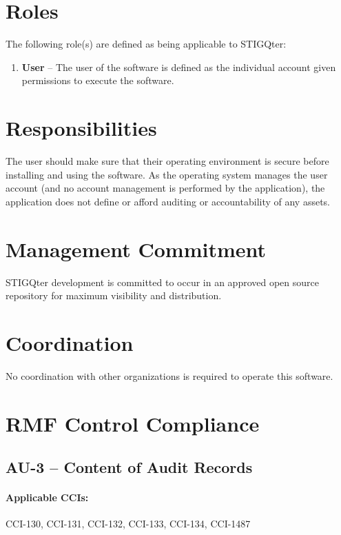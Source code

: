\documentclass[letterpaper, 10pt, twoside]{article}
\begin{document}
\section{Roles}
\label{sec:roles}

The following role(s) are defined as being applicable to STIGQter:
\begin{enumerate}
	\item \textbf{User} -- The user of the software is defined as the individual account given permissions to execute the software.
\end{enumerate}

\section{Responsibilities}
\label{sec:responsibilities}

The user should make sure that their operating environment is secure before installing and using the software. As the operating system manages the user account (and no account management is performed by the application), the application does not define or afford auditing or accountability of any assets.

\section{Management Commitment}

STIGQter development is committed to occur in an approved open source repository for maximum visibility and distribution.

\section{Coordination}

No coordination with other organizations is required to operate this software.

\section{RMF Control Compliance}

\subsection{AU-3 -- Content of Audit Records}

\paragraph{Applicable CCIs:} CCI-130, CCI-131, CCI-132, CCI-133, CCI-134, CCI-1487
\end{document}
